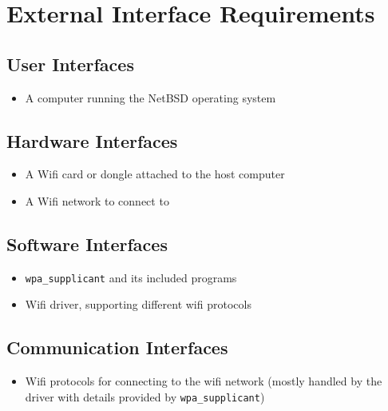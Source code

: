 \section{External Interface Requirements}

\subsection{User Interfaces}
\begin{itemize}
  \item A computer running the NetBSD operating system
\end{itemize}

\subsection{Hardware Interfaces}
\begin{itemize}
  \item A Wifi card or dongle attached to the host computer
  \item A Wifi network to connect to
\end{itemize}

\subsection{Software Interfaces}
\begin{itemize}
  \item \texttt{wpa\_supplicant} and its included programs
  \item Wifi driver, supporting different wifi protocols
\end{itemize}

\subsection{Communication Interfaces}
\begin{itemize}
  \item Wifi protocols for connecting to the wifi network (mostly handled by the driver with details provided by \texttt{wpa\_supplicant})
\end{itemize}
